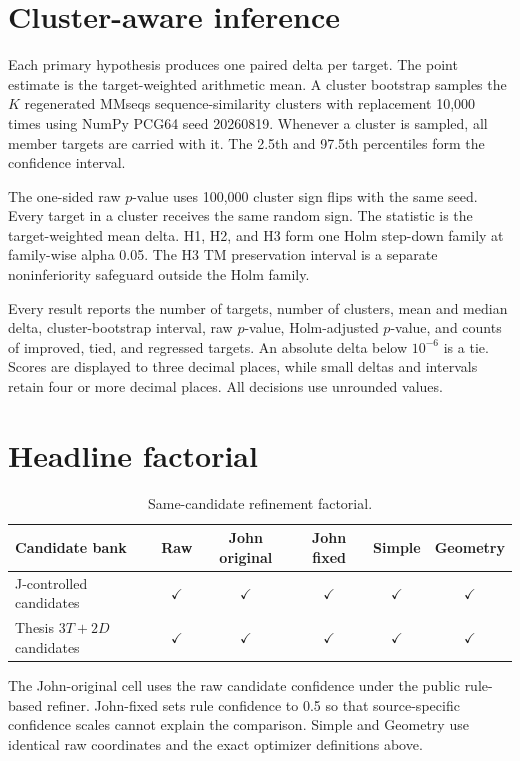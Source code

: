 \documentclass[12pt,a4paper,oneside]{report}
\begin{document}
\section{Cluster-aware inference}

Each primary hypothesis produces one paired delta per target. The point estimate is
the target-weighted arithmetic mean. A cluster bootstrap samples the $K$ regenerated
MMseqs sequence-similarity clusters with replacement 10,000 times using NumPy PCG64
seed 20260819. Whenever a cluster is sampled, all member targets are carried with it.
The 2.5th and 97.5th percentiles form the confidence interval.

The one-sided raw $p$-value uses 100,000 cluster sign flips with the same seed. Every
target in a cluster receives the same random sign. The statistic is the target-weighted
mean delta. H1, H2, and H3 form one Holm step-down family at family-wise alpha 0.05.
The H3 TM preservation interval is a separate noninferiority safeguard outside the
Holm family.

Every result reports the number of targets, number of clusters, mean and median delta,
cluster-bootstrap interval, raw $p$-value, Holm-adjusted $p$-value, and counts of
improved, tied, and regressed targets. An absolute delta below $10^{-6}$ is a tie.
Scores are displayed to three decimal places, while small deltas and intervals retain
four or more decimal places. All decisions use unrounded values.

\section{Headline factorial}

\begin{table}[H]
\centering
\caption{Same-candidate refinement factorial.}
\begin{tabularx}{\textwidth}{Xccccc}
\toprule
Candidate bank & Raw & John original & John fixed & Simple & Geometry \\
\midrule
J-controlled candidates & $\checkmark$ & $\checkmark$ & $\checkmark$ & $\checkmark$ & $\checkmark$ \\
Thesis $3T+2D$ candidates & $\checkmark$ & $\checkmark$ & $\checkmark$ & $\checkmark$ & $\checkmark$ \\
\bottomrule
\end{tabularx}
\end{table}

The John-original cell uses the raw candidate confidence under the public rule-based
refiner. John-fixed sets rule confidence to 0.5 so that source-specific confidence
scales cannot explain the comparison. Simple and Geometry use identical raw
coordinates and the exact optimizer definitions above.
\end{document}
